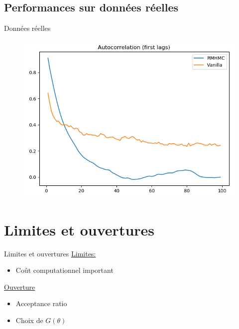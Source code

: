 \documentclass{beamer}
\begin{document}
\subsection{Performances sur données réelles}
\begin{frame}{Données réelles}
   \begin{figure}
   \includegraphics[scale=0.4]{figs/autocorr_real_6_vs_100.png}
   \end{figure}
\end{frame}

\section{Limites et ouvertures}
\begin{frame}{Limites et ouvertures}
\underline{Limites:}
\begin{itemize}
\item Coût computationnel important
\end{itemize}

\underline{Ouverture}
\begin{itemize}
\item Acceptance ratio
\item Choix de $G(\theta)$
\end{itemize}
\end{frame}

  \begin{frame}
  
  
  \end{frame}
 

  
\end{document}
